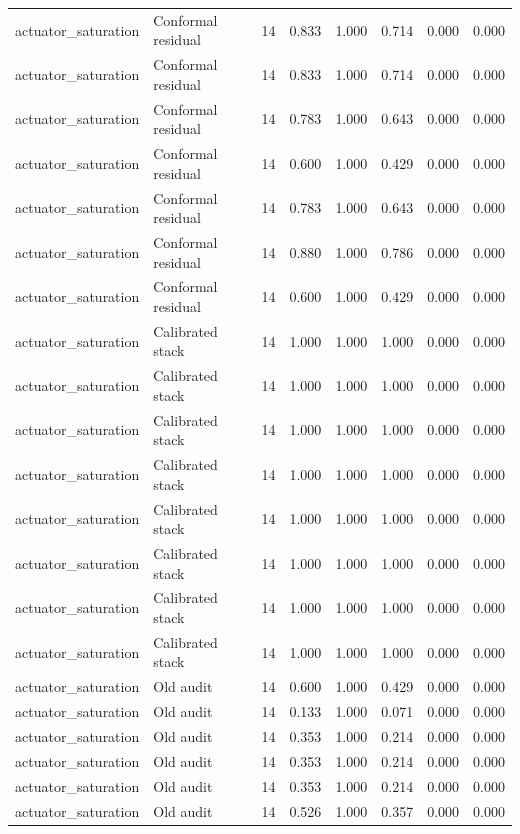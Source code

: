 {\begin{longtable}{llrrrrrr}
actuator\_saturation & Conformal residual & 14 & 0.833 & 1.000 & 0.714 & 0.000 & 0.000 \\
actuator\_saturation & Conformal residual & 14 & 0.833 & 1.000 & 0.714 & 0.000 & 0.000 \\
actuator\_saturation & Conformal residual & 14 & 0.783 & 1.000 & 0.643 & 0.000 & 0.000 \\
actuator\_saturation & Conformal residual & 14 & 0.600 & 1.000 & 0.429 & 0.000 & 0.000 \\
actuator\_saturation & Conformal residual & 14 & 0.783 & 1.000 & 0.643 & 0.000 & 0.000 \\
actuator\_saturation & Conformal residual & 14 & 0.880 & 1.000 & 0.786 & 0.000 & 0.000 \\
actuator\_saturation & Conformal residual & 14 & 0.600 & 1.000 & 0.429 & 0.000 & 0.000 \\
actuator\_saturation & Calibrated stack & 14 & 1.000 & 1.000 & 1.000 & 0.000 & 0.000 \\
actuator\_saturation & Calibrated stack & 14 & 1.000 & 1.000 & 1.000 & 0.000 & 0.000 \\
actuator\_saturation & Calibrated stack & 14 & 1.000 & 1.000 & 1.000 & 0.000 & 0.000 \\
actuator\_saturation & Calibrated stack & 14 & 1.000 & 1.000 & 1.000 & 0.000 & 0.000 \\
actuator\_saturation & Calibrated stack & 14 & 1.000 & 1.000 & 1.000 & 0.000 & 0.000 \\
actuator\_saturation & Calibrated stack & 14 & 1.000 & 1.000 & 1.000 & 0.000 & 0.000 \\
actuator\_saturation & Calibrated stack & 14 & 1.000 & 1.000 & 1.000 & 0.000 & 0.000 \\
actuator\_saturation & Calibrated stack & 14 & 1.000 & 1.000 & 1.000 & 0.000 & 0.000 \\
actuator\_saturation & Old audit & 14 & 0.600 & 1.000 & 0.429 & 0.000 & 0.000 \\
actuator\_saturation & Old audit & 14 & 0.133 & 1.000 & 0.071 & 0.000 & 0.000 \\
actuator\_saturation & Old audit & 14 & 0.353 & 1.000 & 0.214 & 0.000 & 0.000 \\
actuator\_saturation & Old audit & 14 & 0.353 & 1.000 & 0.214 & 0.000 & 0.000 \\
actuator\_saturation & Old audit & 14 & 0.353 & 1.000 & 0.214 & 0.000 & 0.000 \\
actuator\_saturation & Old audit & 14 & 0.526 & 1.000 & 0.357 & 0.000 & 0.000 \\

\end{longtable}}

